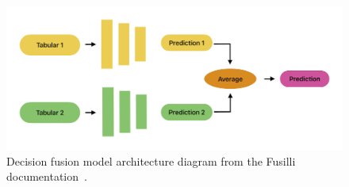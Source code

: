 \begin{figure}[h]
    \centering
    \includegraphics[width=1\linewidth]{figures//diagrams/TabularDecision}
    \caption[Decision fusion model architecture diagram.]{Decision fusion model architecture diagram from the Fusilli documentation~\cite{townendFlorencejtFusilliFusilli2024}.}
    \label{fig:TabularDecision}
\end{figure}

%
%
%

